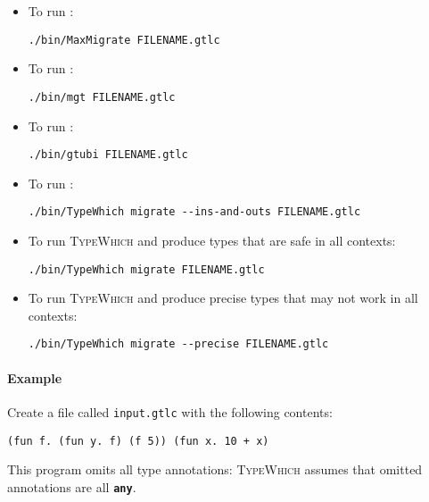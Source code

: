 \documentclass{book}
\newcommand{\system}{\textsc{TypeWhich}\xspace}
\newcommand{\kw}[1]{\textbf{\texttt{#1}}}
\begin{document}
\begin{itemize}

\item To run \citet{migeed:decidable}:
     
\begin{verbatim}
./bin/MaxMigrate FILENAME.gtlc
\end{verbatim}

\item To run \citet{campora:migrating}:

\begin{verbatim}
./bin/mgt FILENAME.gtlc
\end{verbatim}

\item To run \citet{siek:gti}:

\begin{verbatim}
./bin/gtubi FILENAME.gtlc
\end{verbatim}

\item To run \citet{rastogi:gti}:
\begin{verbatim}
./bin/TypeWhich migrate --ins-and-outs FILENAME.gtlc
\end{verbatim}

\item To run \system{} and produce types that are safe in all contexts:
\begin{verbatim}
./bin/TypeWhich migrate FILENAME.gtlc
\end{verbatim}

\item To run \system{} and produce precise types that may not work in all
contexts:
\begin{verbatim}
./bin/TypeWhich migrate --precise FILENAME.gtlc
\end{verbatim}

\end{itemize}

\paragraph{Example}
Create a file called \texttt{input.gtlc} with the following contents:

\begin{verbatim}
(fun f. (fun y. f) (f 5)) (fun x. 10 + x)
\end{verbatim}

This program omits all type annotations: \system assumes that omitted
annotations are all \kw{any}.
\end{document}
